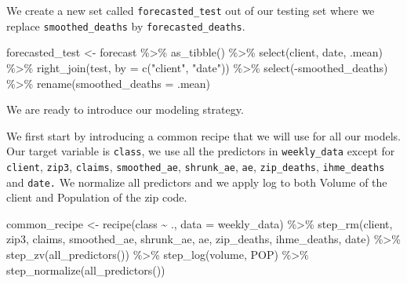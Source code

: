 \documentclass[
]{article}
\newenvironment{Shaded}{\begin{snugshade}}{\end{snugshade}}
\newcommand{\AttributeTok}[1]{\textcolor[rgb]{0.77,0.63,0.00}{#1}}
\newcommand{\FunctionTok}[1]{\textcolor[rgb]{0.00,0.00,0.00}{#1}}
\newcommand{\NormalTok}[1]{#1}
\newcommand{\OtherTok}[1]{\textcolor[rgb]{0.56,0.35,0.01}{#1}}
\newcommand{\SpecialCharTok}[1]{\textcolor[rgb]{0.00,0.00,0.00}{#1}}
\newcommand{\StringTok}[1]{\textcolor[rgb]{0.31,0.60,0.02}{#1}}
\begin{document}
We create a new set called \texttt{forecasted\_test} out of our testing
set where we replace \texttt{smoothed\_deaths} by
\texttt{forecasted\_deaths}.

\begin{Shaded}
\begin{Highlighting}[]
\NormalTok{forecasted\_test }\OtherTok{\textless{}{-}}
\NormalTok{  forecast }\SpecialCharTok{\%\textgreater{}\%}
  \FunctionTok{as\_tibble}\NormalTok{() }\SpecialCharTok{\%\textgreater{}\%}
  \FunctionTok{select}\NormalTok{(client, date, .mean) }\SpecialCharTok{\%\textgreater{}\%}
  \FunctionTok{right\_join}\NormalTok{(test, }\AttributeTok{by =} \FunctionTok{c}\NormalTok{(}\StringTok{"client"}\NormalTok{, }\StringTok{"date"}\NormalTok{)) }\SpecialCharTok{\%\textgreater{}\%}
  \FunctionTok{select}\NormalTok{(}\SpecialCharTok{{-}}\NormalTok{smoothed\_deaths) }\SpecialCharTok{\%\textgreater{}\%}
  \FunctionTok{rename}\NormalTok{(}\AttributeTok{smoothed\_deaths =}\NormalTok{ .mean)}
\end{Highlighting}
\end{Shaded}

We are ready to introduce our modeling strategy.

We first start by introducing a common recipe that we will use for all
our models. Our target variable is \texttt{class}, we use all the
predictors in \texttt{weekly\_data} except for \texttt{client},
\texttt{zip3}, \texttt{claims}, \texttt{smoothed\_ae},
\texttt{shrunk\_ae}, \texttt{ae}, \texttt{zip\_deaths},
\texttt{ihme\_deaths} and \texttt{date.} We normalize all predictors and
we apply log to both Volume of the client and Population of the zip
code.

\begin{Shaded}
\begin{Highlighting}[]
\NormalTok{common\_recipe }\OtherTok{\textless{}{-}}
  \FunctionTok{recipe}\NormalTok{(class }\SpecialCharTok{\textasciitilde{}}\NormalTok{ ., }\AttributeTok{data =}\NormalTok{ weekly\_data) }\SpecialCharTok{\%\textgreater{}\%}
  \FunctionTok{step\_rm}\NormalTok{(client, zip3, claims, smoothed\_ae, shrunk\_ae, ae, zip\_deaths, ihme\_deaths, date) }\SpecialCharTok{\%\textgreater{}\%}
  \FunctionTok{step\_zv}\NormalTok{(}\FunctionTok{all\_predictors}\NormalTok{()) }\SpecialCharTok{\%\textgreater{}\%}
  \FunctionTok{step\_log}\NormalTok{(volume, POP) }\SpecialCharTok{\%\textgreater{}\%}
  \FunctionTok{step\_normalize}\NormalTok{(}\FunctionTok{all\_predictors}\NormalTok{())}
\end{Highlighting}
\end{Shaded}
\end{document}
